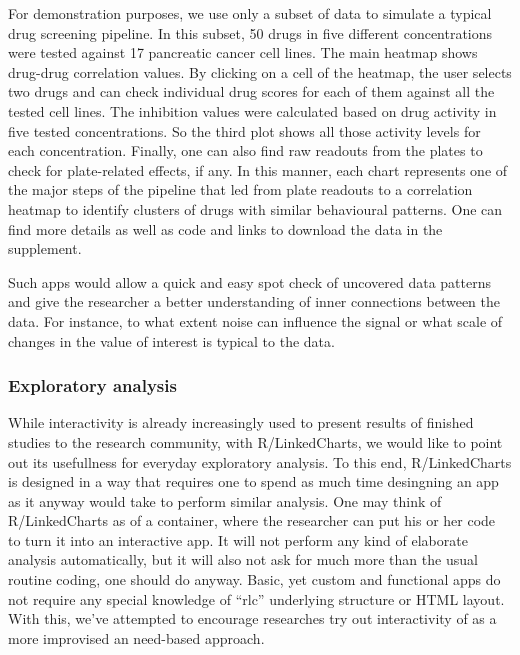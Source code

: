 \documentclass[twocolumn,10pt]{article}
\begin{document}
For demonstration purposes, we use only a subset of data to simulate a typical drug screening pipeline. In this subset, 50 drugs in five different concentrations were tested against 17 pancreatic cancer cell lines. The main heatmap shows drug-drug correlation values. By clicking on a cell of the heatmap, the user selects two drugs and can check individual drug scores for each of them against all the tested cell lines. The inhibition values were calculated based on drug activity in five tested concentrations. So the third plot shows all those activity levels for each concentration. Finally, one can also find raw readouts from the plates to check for plate-related effects, if any. In this manner, each chart represents one of the major steps of the pipeline that led from plate readouts to a correlation heatmap to identify clusters of drugs with similar behavioural patterns. One can find more details as well as code and links to download the data in the supplement. 

Such apps would allow a quick and easy spot check of uncovered data patterns and give the researcher a better understanding of inner connections between the data. For instance, to what extent noise can influence the signal or what scale of changes in the value of interest is typical to the data.

\subsubsection{Exploratory analysis}

While interactivity is already increasingly used to present results of finished studies to the research community, with R/LinkedCharts, we would like to point out its usefullness for everyday exploratory analysis. To this end, R/LinkedCharts is designed in a way that requires one to spend as much time desingning an app as it anyway would take to perform similar analysis. One may think of R/LinkedCharts as of a container, where the researcher can put his or her code to turn it into an interactive app. It will not perform any kind of elaborate analysis automatically, but it will also not ask for much more than the usual routine coding, one should do anyway. Basic, yet custom and functional apps do not require any special knowledge of ``rlc'' underlying structure or HTML layout. With this, we've attempted to encourage researches try out interactivity of as a more improvised an need-based approach.
\end{document}
